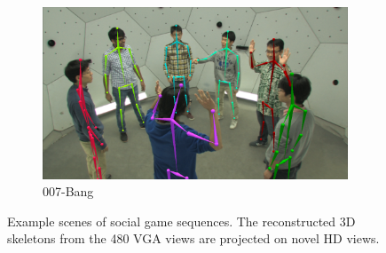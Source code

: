 \begin{figure}[t]
\begin{subfigure}{0.245\textwidth}
		\includegraphics[width=\textwidth]{figures/datasetEx/bang}
				\caption{007-Bang}
	\end{subfigure}
	\caption{Example scenes of social game sequences. The reconstructed 3D skeletons from the 480 VGA views are projected on novel HD views.} 
	\label{fig:socialGames}
\end{figure}


